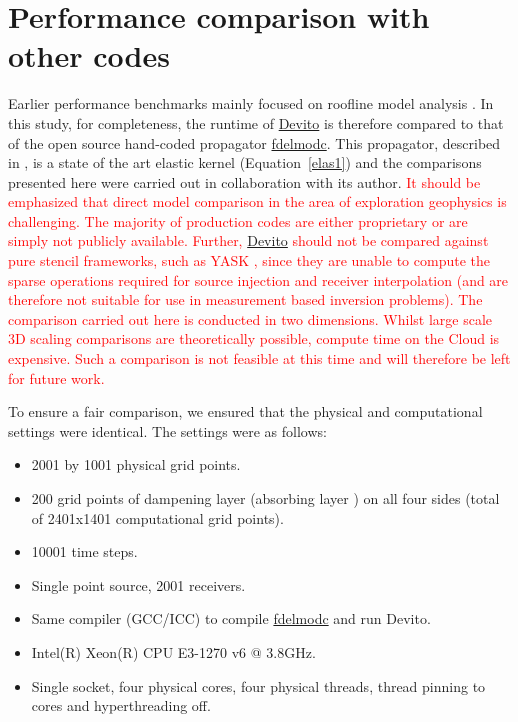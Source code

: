 \documentclass[10pt, conference]{IEEEtran}
\newcommand{\devito}{\href{https://github.com/devitocodes/devito}{Devito} }
\begin{document}
\section{Performance comparison with other
codes}\label{performance-comparison-with-other-codes}

Earlier performance benchmarks mainly focused on roofline model analysis
\textcolor{red}{\cite{sevendwarfs, patterson, williams2009roofline, louboutin2016ppf}}.
In this study, for completeness, the runtime of \devito is therefore
compared to that of the open source hand-coded propagator
\href{https://github.com/JanThorbecke/OpenSource.git}{fdelmodc}. This propagator,
described in \cite{thorbecke}, is a state of the art elastic kernel
(Equation~\ref{elas1}) and the comparisons presented here were carried out
in collaboration with its author.
\textcolor{red}{It should be emphasized that direct model comparison in
the area of exploration geophysics is challenging. The majority of production
codes are either proprietary or are simply not publicly available. Further,
\devito should not be compared against pure stencil frameworks,
such as YASK \cite{yask}, since they are unable to compute the sparse operations
required for source injection and receiver interpolation (and are therefore not
suitable for use in measurement based inversion problems). The comparison carried out
here is conducted in two dimensions. Whilst large scale 3D scaling comparisons are theoretically
possible, compute time on the Cloud is expensive. Such a comparison is not feasible at this
time and will therefore be left for future work.}

To ensure a fair comparison, we ensured that the
physical and computational settings were identical. The settings were as
follows:

\begin{itemize}
\itemsep1pt\parskip0pt
\item
  2001 by 1001 physical grid points.
\item
  200 grid points of dampening layer (absorbing layer \cite{cerjan}) on
  all four sides (total of 2401x1401 computational grid points).
\item
  10001 time steps.
\item
  Single point source, 2001 receivers.
\item
  Same compiler (GCC/ICC) to compile
  \href{https://github.com/JanThorbecke/OpenSource.git}{fdelmodc} and
  run Devito.
\item
  Intel(R) Xeon(R) CPU E3-1270 v6 @ 3.8GHz.
\item
  Single socket, four physical cores, four physical threads, thread
  pinning to cores and hyperthreading off.
\end{itemize}
\end{document}
